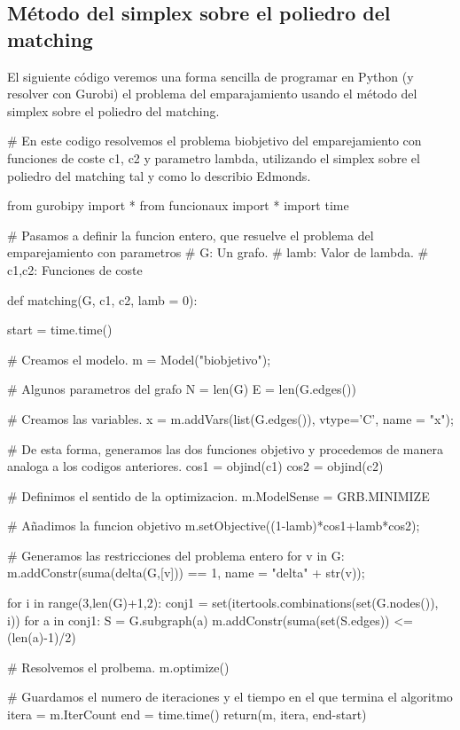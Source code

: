 \documentclass[twoside,a4paper,openright,12pt,tikz]{book}
\begin{document}
\subsection{Método del simplex sobre el poliedro del matching}
El siguiente código veremos una forma sencilla de programar en Python (y resolver con Gurobi) el problema del emparajamiento usando el método del simplex sobre el poliedro del matching.
\begin{pythone}
# En este codigo resolvemos el problema biobjetivo del emparejamiento con funciones de coste c1, c2 y parametro lambda, utilizando el simplex sobre el poliedro del matching tal y como lo describio Edmonds.

from gurobipy import *
from funcionaux import *
import time


# Pasamos a definir la funcion entero, que resuelve el problema del emparejamiento con parametros
# G: Un grafo.
# lamb: Valor de lambda.
# c1,c2: Funciones de coste

def matching(G, c1, c2, lamb = 0):
    
    start = time.time()
    
    # Creamos el modelo.
    m = Model("biobjetivo");
    
    
    # Algunos parametros del grafo
    N = len(G)
    E = len(G.edges())
    
    # Creamos las variables.
    x = m.addVars(list(G.edges()), vtype='C', name = "x");
    
    # De esta forma, generamos las dos funciones objetivo y procedemos de manera analoga a los codigos anteriores.  
    cos1 = objind(c1)
    cos2 = objind(c2)
    
    # Definimos el sentido de la optimizacion.
    m.ModelSense = GRB.MINIMIZE
    
    # Añadimos la funcion objetivo
    m.setObjective((1-lamb)*cos1+lamb*cos2); 
    
    # Generamos las restricciones del problema entero
    for v in G:
        m.addConstr(suma(delta(G,[v])) == 1, name = "delta" + str(v));
        
    for i in range(3,len(G)+1,2):
        conj1 = set(itertools.combinations(set(G.nodes()), i))
        for a in conj1:
            S = G.subgraph(a)
            m.addConstr(suma(set(S.edges)) <= (len(a)-1)/2)
    
    # Resolvemos el prolbema.
    m.optimize()
    
    # Guardamos el numero de iteraciones y el tiempo en el que termina el algoritmo
    itera = m.IterCount
    end = time.time()
    return(m, itera, end-start)
\end{pythone}
\end{document}
